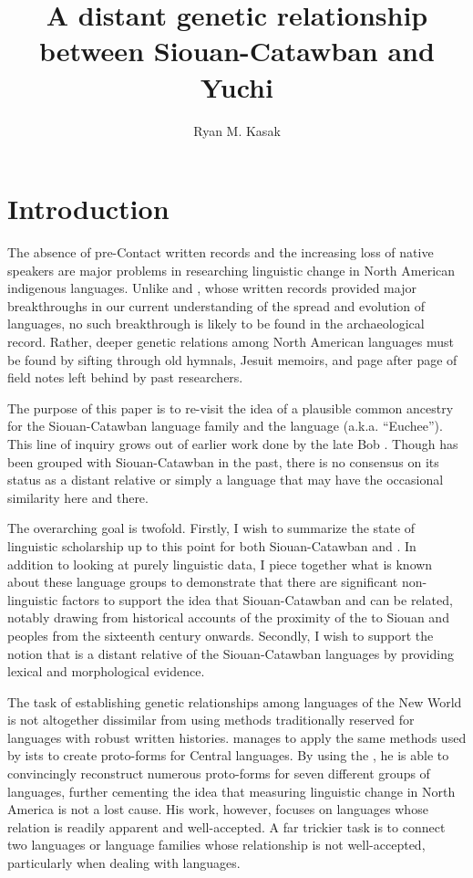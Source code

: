 \documentclass[output=paper]{LSP/langsci}
\author{Ryan M. Kasak}
\title{A distant genetic relationship between {Siouan-Catawban} and {Yuchi}}
\begin{document}
\section{Introduction}\label{sec:kasak:1}

The absence of pre-Contact written records and the increasing loss of native speakers are major problems in researching linguistic change in North American indigenous languages. Unlike  and , whose written records provided major breakthroughs in our current understanding of the spread and evolution of  languages, no such breakthrough is likely to be found in the archaeological record. Rather, deeper genetic relations among North American languages must be found by sifting through old hymnals, Jesuit memoirs, and page after page of field notes left behind by past researchers.

The purpose of this paper is to re-visit the idea of a plausible common ancestry for the Siouan-Catawban language family and the language   (a.k.a. ``Euchee''). This line of inquiry grows out of earlier work done by the late Bob \citet{Rankin1996,Rankin1998scy}. Though  has been grouped with Siouan-Catawban in the past, there is no consensus on its status as a distant relative or simply a language that may have the occasional similarity here and there.

The overarching goal is twofold. Firstly, I wish to summarize the state of linguistic scholarship up to this point for both Siouan-Catawban and . In addition to looking at purely linguistic data, I piece together what is known about these language groups to demonstrate that there are significant non-linguistic factors to support the idea that Siouan-Catawban and  can be related, notably drawing from historical accounts of the proximity of the  to Siouan and  peoples from the sixteenth century onwards. Secondly, I wish to support the notion that  is a distant relative of the Siouan-Catawban languages by providing lexical and morphological evidence.

The task of establishing genetic relationships among languages of the New World is not altogether dissimilar from using methods traditionally reserved for languages with robust written histories. \citet{Bloomfield1925} manages to apply the same methods used by ists to create proto-forms for Central  languages. By using the , he is able to convincingly reconstruct numerous proto-forms for seven different groups of  languages, further cementing the idea that measuring linguistic change in North America is not a lost cause. His work, however, focuses on languages whose relation is readily apparent and well-accepted. A far trickier task is to connect two languages or language families whose relationship is not well-accepted, particularly when dealing with  languages. 
\end{document}
